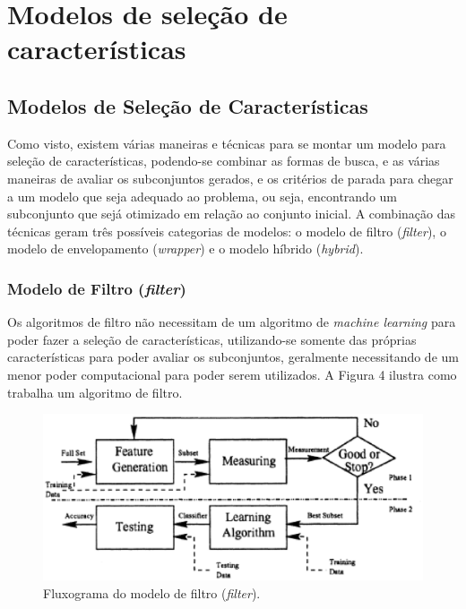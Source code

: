 \chapter[Modelos de seleção de características]{Modelos de seleção de características}
\label{ch:modelos}

\section{Modelos de Seleção de Características}

Como visto, existem várias maneiras e técnicas para se montar um modelo para seleção de características, podendo-se combinar as formas de busca, e as várias maneiras de avaliar os subconjuntos gerados, e os critérios de parada para chegar a um modelo que seja adequado ao problema, ou seja, encontrando um subconjunto que sejá otimizado em relação ao conjunto inicial. A combinação das técnicas geram três possíveis categorias de modelos: o modelo de filtro (\textit {filter}), o modelo de envelopamento (\textit {wrapper}) e o modelo híbrido (\textit {hybrid}). 

\subsection{Modelo de Filtro (\textit{filter})}

Os algoritmos de filtro não necessitam de um algoritmo de \textit{machine learning} para poder fazer a seleção de características, utilizando-se somente das próprias características para poder avaliar os subconjuntos, geralmente necessitando de um menor poder computacional para poder serem utilizados. A Figura 4 ilustra como trabalha um algoritmo de filtro.

\begin{figure}[h]
	\centering
	\label{fig05}
		\includegraphics[keepaspectratio=true,scale=1]{figuras/fig05.eps}
	\caption{Fluxograma do modelo de filtro (\textit{filter}). \cite{huan_1998}}
\end{figure}

